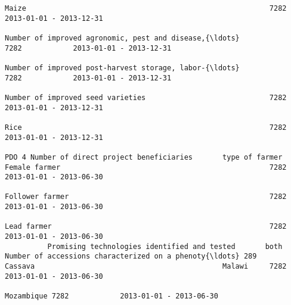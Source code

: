 \documentclass[11pt]{article}
\begin{document}
\begin{Verbatim}[commandchars=\\\{\}]
                                                                                                                                                              Maize                                                         7282            2013-01-01 - 2013-12-31   
                                                                                                                                                              Number of improved agronomic, pest and disease,{\ldots}            7282            2013-01-01 - 2013-12-31   
                                                                                                                                                              Number of improved post-harvest storage, labor-{\ldots}            7282            2013-01-01 - 2013-12-31   
                                                                                                                                                              Number of improved seed varieties                             7282            2013-01-01 - 2013-12-31   
                                                                                                                                                              Rice                                                          7282            2013-01-01 - 2013-12-31   
                                                                         PDO 4 Number of direct project beneficiaries       type of farmer                    Female farmer                                                 7282            2013-01-01 - 2013-06-30   
                                                                                                                                                              Follower farmer                                               7282            2013-01-01 - 2013-06-30   
                                                                                                                                                              Lead farmer                                                   7282            2013-01-01 - 2013-06-30   
          Promising technologies identified and tested       both        Number of accessions characterized on a phenoty{\ldots} 289                               Cassava                                            Malawi     7282            2013-01-01 - 2013-06-30   
                                                                                                                                                                                                                 Mozambique 7282            2013-01-01 - 2013-06-30   

\end{Verbatim}
\end{document}
